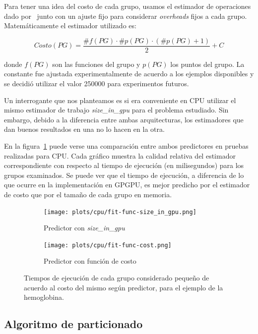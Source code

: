 Para tener una idea del costo de cada grupo, usamos el estimador de operaciones
dado por~\cite{Nitsche2014} junto con un ajuste fijo para considerar \textit{overheads} fijos a
cada grupo. Matem\'aticamente el estimador utilizado es:

\begin{equation}
    Costo(PG) = \frac{\#f(PG) \cdot \#p(PG) \cdot (\#p(PG) + 1)}{2} + C
\end{equation}

donde $f(PG)$ son las funciones del grupo y $p(PG)$ los puntos del grupo. La
constante fue ajustada experimentalmente de acuerdo a los ejemplos disponibles y
se decidi\'o utilizar el valor 250000 para experimentos futuros.

Un interrogante que nos planteamos es si era conveniente en CPU utilizar el mismo
estimador de trabajo \textit{size\_in\_gpu} para el problema estudiado. Sin
embargo, debido a la diferencia entre ambas arquitecturas, los estimadores que
dan buenos resultados en una no lo hacen en la otra.

En la figura~\ref{fig:comp-size-cost} puede verse una comparaci\'on entre ambos
predictores en pruebas realizadas para CPU. Cada gr\'afico muestra la calidad
relativa del estimador correspondiente con respecto al tiempo de ejecuci\'on
(en milisegundos) para los grupos examinados. Se puede ver que el tiempo de
ejecuci\'on, a diferencia de lo que ocurre en la implementaci\'on en GPGPU, es
mejor predicho por el estimador de costo que por el tama\~no de cada grupo en
memoria.

\begin{figure}[htbp]
   \centering
   \begin{subfigure}[b]{\plotwidthtres}
     \texttt{[image: plots/cpu/fit-func-size\_in\_gpu.png]}
     \caption{Predictor con \textit{size\_in\_gpu}}
   \end{subfigure}
   \begin{subfigure}[b]{\plotwidthtres}
     \texttt{[image: plots/cpu/fit-func-cost.png]}
     \caption{Predictor con funci\'on de costo}
   \end{subfigure}
   \caption{Tiempos de ejecuci\'on de cada grupo considerado peque\~no de acuerdo
    al costo del mismo seg\'un predictor, para el ejemplo de la hemoglobina.}
   \label{fig:comp-size-cost}
\end{figure}

\subsection{Algoritmo de particionado}

